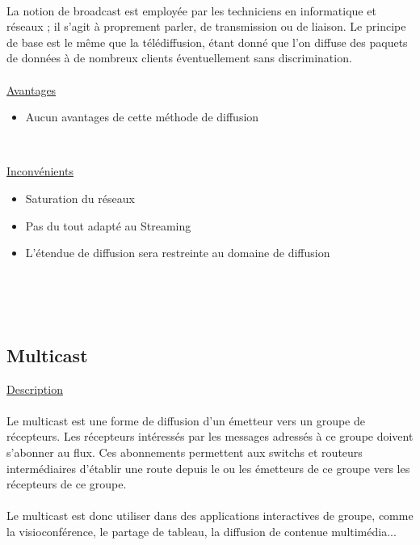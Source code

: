\documentclass{report}
\begin{document}
    \\
    La notion de broadcast est employée par les techniciens en informatique et réseaux ; il s'agit à proprement parler, de transmission ou de liaison. 
    Le principe de base est le même que la télédiffusion, étant donné que l'on diffuse des paquets de données à de nombreux clients éventuellement sans discrimination.    \\
   
    \\
    \underline{Avantages}
    \\
   \begin{itemize}
       \item Aucun avantages de cette méthode de diffusion
   \end{itemize} 
    \\
    \hfill
    
    \underline{Inconvénients}
    \\
   \begin{itemize}
       \item Saturation du réseaux
       \item Pas du tout adapté au Streaming
       \item L'étendue de diffusion sera restreinte au domaine de diffusion
   \end{itemize} 
    \\
    \\
    
    \hfill{\\}
    
        \subsection{Multicast}
        
  \underline{Description}
    \\
    
    \\
   Le multicast est une forme de diffusion d'un émetteur vers un groupe de récepteurs. Les récepteurs intéressés par les messages adressés à ce groupe doivent s'abonner au flux. Ces abonnements permettent aux switchs et routeurs intermédiaires d'établir une route depuis le ou les émetteurs de ce groupe vers les récepteurs de ce groupe.
    \\
    \\
    Le multicast est donc utiliser dans des applications interactives de groupe, comme la visioconférence, le partage de tableau, la diffusion de contenue multimédia...
    \\
   
\end{document}
